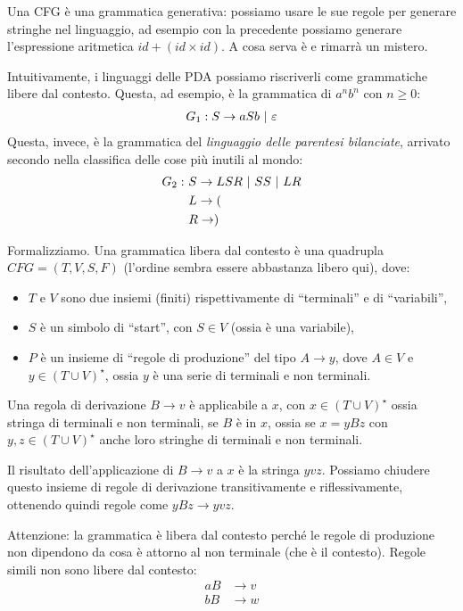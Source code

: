 Una CFG \`e una grammatica generativa: possiamo usare le sue regole per generare stringhe nel linguaggio, ad esempio con la precedente possiamo generare l'espressione aritmetica $id + ( id \times id )$.
A cosa serva \`e e rimarr\`a un mistero.

Intuitivamente, i linguaggi delle PDA possiamo riscriverli come grammatiche libere dal contesto. Questa, ad esempio, \`e la grammatica di $a^n b^n$ con $n \ge 0$:
\begin{align*}
	G_1 : S \to aSb \ | \  \varepsilon
\end{align*}
Questa, invece, \`e la grammatica del \emph{linguaggio delle parentesi bilanciate}, arrivato secondo nella classifica delle cose pi\`u inutili al mondo:
\begin{align*}
	G_2 : \ & S \to LSR \ | \  SS \ | \  LR \\
	& L \to ( \\
	& R \to )
\end{align*}

Formalizziamo.
Una grammatica libera dal contesto \`e una quadrupla $CFG = (T, V, S, F)$ (l'ordine sembra essere abbastanza libero qui), dove:
\begin{itemize}
	\item $T$ e $V$ sono due insiemi (finiti) rispettivamente di ``terminali'' e di ``variabili'',
	\item $S$ \`e un simbolo di ``start'', con $S \in V$ (ossia \`e una variabile),
	\item $P$ \`e un insieme di ``regole di produzione'' del tipo $A \to y$, dove $A \in V$ e $y \in {(T \cup V)}^{\star}$, ossia $y$ \`e una serie di terminali e non terminali.
\end{itemize}

Una regola di derivazione $B \to v$ \`e applicabile a $x$, con $x \in {(T \cup V)}^{\star}$ ossia stringa di terminali e non terminali, se $B$ \`e in $x$, ossia se $x = y B z$ con $y, z \in {(T \cup V)}^{\star}$ anche loro stringhe di terminali e non terminali.

Il risultato dell'applicazione di $B \to v$ a $x$ \`e la stringa $y v z$.
Possiamo chiudere questo insieme di regole di derivazione transitivamente e riflessivamente, ottenendo quindi regole come $y B z \to y v z$.

Attenzione: la grammatica \`e libera dal contesto perch\'e le regole di produzione non dipendono da cosa \`e attorno al non terminale (che \`e il contesto).
Regole simili non sono libere dal contesto:
\begin{align*}
	a B & \to v \\
	b B & \to w
\end{align*}

